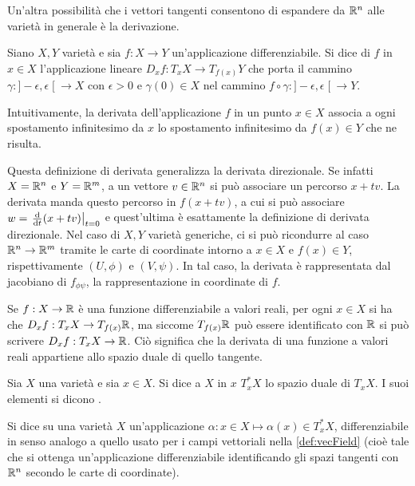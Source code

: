Un'altra possibilità che i vettori tangenti consentono di espandere da $\mathbb{R}^{n}$ alle varietà in generale è la derivazione.
\begin{definition}
  Siano $X,Y$ varietà e sia $f:X\to Y$ un'applicazione differenziabile. Si dice  di $f$ in $x \in X$ l'applicazione lineare $D_x f:T_x X \to T_{f(x)}Y$ che porta il cammino $\gamma: ]-\epsilon, \epsilon\;[\ \to X$ con $\epsilon>0$ e $\gamma(0) \in X$ nel cammino $f \circ \gamma:]-\epsilon, \epsilon\;[\ \to Y$.
\end{definition}
\begin{remark}
  Intuitivamente, la derivata dell'applicazione $f$ in un punto $x \in X$ associa a ogni spostamento infinitesimo da $x$ lo spostamento infinitesimo da $f(x) \in Y$ che ne risulta.
\end{remark}
\begin{remark}
  Questa definizione di derivata generalizza la derivata direzionale. Se infatti $X = \mathbb{R}^{n}$ e $Y = \mathbb{R}^{m}$, a un vettore $v \in \mathbb{R}^{n}$ si può associare un percorso $x + tv$. La derivata manda questo percorso in $f(x+tv)$, a cui si può associare $w = \eval{\dv{t}(x+tv)}_{t=0}$ e quest'ultima è esattamente la definizione di derivata direzionale. Nel caso di $X,Y$ varietà generiche, ci si può ricondurre al caso $\mathbb{R}^{n} \to \mathbb{R}^{m}$ tramite le carte di coordinate intorno a $x \in X$ e $f(x)\in Y$, rispettivamente $(U, \phi)$ e $(V,\psi)$. In tal caso, la derivata è rappresentata dal jacobiano di $f_{\phi \psi}$, la rappresentazione in coordinate di $f$.
\end{remark}

Se $f:X \to \mathbb{R}$ è una funzione differenziabile a valori reali, per ogni $x \in X$ si ha che $D_x f: T_x X \to T_{f(x)}\mathbb{R}$, ma siccome $T_{f(x)}\mathbb{R}$ può essere identificato con $\mathbb{R}$ si può scrivere $D_x f: T_x X \to \mathbb{R}$. Ciò significa che la derivata di una funzione a valori reali appartiene allo spazio duale di quello tangente.

\begin{definition}
  Sia $X$ una varietà e sia $x \in X$. Si dice  a $X$ in $x$ $T_x^* X$ lo spazio duale di $T_x X$. I suoi elementi si dicono .
\end{definition}
\begin{definition}
  Si dice  su una varietà $X$ un'applicazione $\alpha: x \in X \mapsto \alpha(x) \in T_x^* X$, differenziabile in senso analogo a quello usato per i campi vettoriali nella \autoref{def:vecField} (cioè tale che si ottenga un'applicazione differenziabile identificando gli spazi tangenti con $\mathbb{R}^{n}$ secondo le carte di coordinate).
\end{definition}

